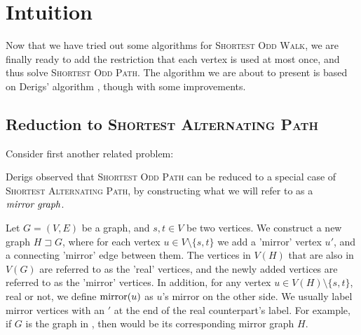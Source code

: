 \section{Intuition}
Now that we have tried out some algorithms for \textsc{Shortest Odd Walk}, we are finally ready to add the restriction that each vertex is used at most once, and thus solve \textsc{Shortest Odd Path}. The algorithm we are about to present is based on Derigs' algorithm \cite{source:derigs_shortest_odd_path}, though with some improvements.

\subsection{Reduction to \textsc{Shortest Alternating Path}}
\label{subsection:reduction}
Consider first another related problem:

\noindent{}

Derigs observed that \textsc{Shortest Odd Path} can be reduced to a special case of \textsc{Shortest Alternating Path}, by constructing what we will refer to as a $\emph{mirror graph}$.

\begin{definition}
    \label{def:mirror-graph}
    Let $G = (V, E)$ be a graph, and $s,t \in V$ be two vertices.
    We construct a new graph $H \sqsupset G$, where for each vertex $u \in V \setminus \{s,t\}$ we add a 'mirror' vertex $u'$, and a connecting 'mirror' edge between them. 
    The vertices in $V(H)$ that are also in $V(G)$ are referred to as the 'real' vertices, and the newly added vertices are referred to as the 'mirror' vertices. In addition, for any vertex $u \in V(H) \setminus \{s,t\}$, real or not, we define $\operatorname{mirror}(u)$ as $u$'s mirror on the other side. We usually label mirror vertices with an $'$ at the end of the real counterpart's label.
    For example, if $G$ is the graph in , then  would be its corresponding mirror graph $H$.
\end{definition}

